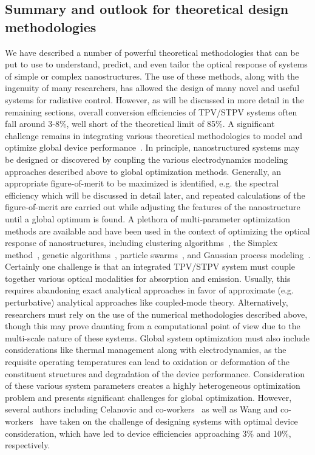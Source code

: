 \documentclass[10pt,letterpaper]{article}
\begin{document}
\subsection{Summary and outlook for theoretical design methodologies}
We have described a number of powerful theoretical methodologies that can be put to use to understand, predict, and even tailor the optical
response of systems of simple or complex nanostructures.  The use of these methods, along with the ingenuity of many researchers, has
allowed the design of many novel and useful systems for radiative control.  However, as will be discussed in more detail in the remaining sections, 
overall conversion efficiencies of TPV/STPV systems often fall around 3-8\%,  well short of the theoretical limit of 85\%.  A significant challenge remains in integrating
various theoretical methodologies to model and optimize global device performance~\cite{g4,g9}.
In principle, nanostructured systems may be designed or discovered by coupling the various electrodynamics modeling approaches described above 
to global optimization methods.  Generally, an appropriate figure-of-merit to be maximized is identified, e.g. the spectral efficiency which will
be discussed in detail later, and repeated calculations of the figure-of-merit are carried out while adjusting the features of the nanostructure until 
a global optimum is found.  A plethora of multi-parameter optimization methods are available and have been used in the context of optimizing the 
optical response of nanostructures, including clustering algorithms~\cite{g4}, the Simplex method~\cite{Simplex, CH_APL_2006}, genetic algorithms~\cite{ga,DB_JApplPhys_2007}, 
particle swarms~\cite{NDJ_JApplPhys_2012, ParticleSwarm}, and Gaussian
process modeling~\cite{miller1}.  Certainly one
challenge is that an integrated TPV/STPV system must couple together various optical modalities for absorption and emission.  Usually, this requires
abandoning exact analytical approaches in favor of approximate (e.g. perturbative) analytical approaches like coupled-mode theory.  Alternatively,
researchers must rely on the use of the numerical methodologies described above, 
though this may
prove daunting from a computational point of view due to the multi-scale nature of these systems.
Global system optimization must also include considerations like thermal management along with electrodynamics, as the
requisite operating temperatures can lead to oxidation or deformation of the
constituent structures and degradation of the device performance.  
Consideration of these various system parameters creates a highly heterogeneous optimization problem
and presents significant challenges for global optimization.  
However, several authors including Celanovic and co-workers~\cite{g4}
as well as Wang and co-workers~\cite{g9} have taken on the challenge of designing systems with optimal device consideration, which have led to device efficiencies approaching 3\% and 
10\%, respectively. 
  
\end{document}

